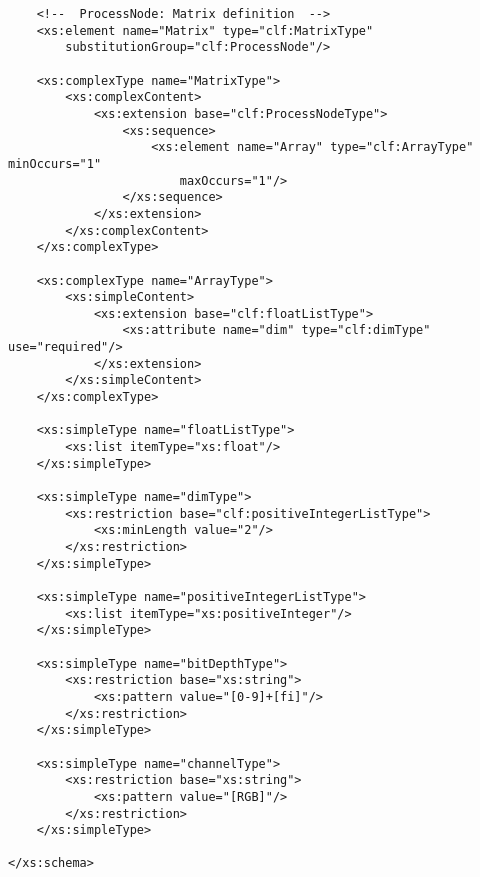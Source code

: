 \begin{lstlisting}
    <!--  ProcessNode: Matrix definition  -->
    <xs:element name="Matrix" type="clf:MatrixType" 
        substitutionGroup="clf:ProcessNode"/>
    
    <xs:complexType name="MatrixType">
        <xs:complexContent>
            <xs:extension base="clf:ProcessNodeType">
                <xs:sequence>
                    <xs:element name="Array" type="clf:ArrayType" minOccurs="1" 
                        maxOccurs="1"/>
                </xs:sequence>
            </xs:extension>
        </xs:complexContent>
    </xs:complexType>
    
    <xs:complexType name="ArrayType">
        <xs:simpleContent>
            <xs:extension base="clf:floatListType">
                <xs:attribute name="dim" type="clf:dimType" use="required"/>
            </xs:extension>
        </xs:simpleContent>
    </xs:complexType>
        
    <xs:simpleType name="floatListType">
        <xs:list itemType="xs:float"/>
    </xs:simpleType>
    
    <xs:simpleType name="dimType">
        <xs:restriction base="clf:positiveIntegerListType">
            <xs:minLength value="2"/>
        </xs:restriction>
    </xs:simpleType>
    
    <xs:simpleType name="positiveIntegerListType">
        <xs:list itemType="xs:positiveInteger"/>
    </xs:simpleType>
    
    <xs:simpleType name="bitDepthType">
        <xs:restriction base="xs:string">
            <xs:pattern value="[0-9]+[fi]"/>
        </xs:restriction>
    </xs:simpleType>
    
    <xs:simpleType name="channelType">
        <xs:restriction base="xs:string">
            <xs:pattern value="[RGB]"/>
        </xs:restriction>
    </xs:simpleType>
    
</xs:schema>
\end{lstlisting}